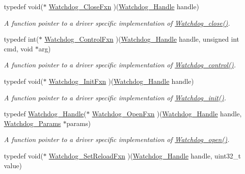 \begin{DoxyCompactItemize}
typedef void($\ast$ \hyperlink{_watchdog_8h_a52c6b4db063cd428c000c7951175f197}{Watchdog\-\_\-\-Close\-Fxn} )(\hyperlink{_watchdog_8h_a00ed22749c947ef200434eeec507f90d}{Watchdog\-\_\-\-Handle} handle)
\begin{DoxyCompactList}\small\item\em A function pointer to a driver specific implementation of \hyperlink{_watchdog_8h_a1c0dfea7011b06f303d01afb631ffbdd}{Watchdog\-\_\-close()}. \end{DoxyCompactList}\item 
typedef int($\ast$ \hyperlink{_watchdog_8h_a36965c48da25f952175822d0f81e1a0a}{Watchdog\-\_\-\-Control\-Fxn} )(\hyperlink{_watchdog_8h_a00ed22749c947ef200434eeec507f90d}{Watchdog\-\_\-\-Handle} handle, unsigned int cmd, void $\ast$arg)
\begin{DoxyCompactList}\small\item\em A function pointer to a driver specific implementation of \hyperlink{_watchdog_8h_aa98a75361edb1e476432669169f2950e}{Watchdog\-\_\-control()}. \end{DoxyCompactList}\item 
typedef void($\ast$ \hyperlink{_watchdog_8h_a21594bd6db5b508572ae7d380b8fae10}{Watchdog\-\_\-\-Init\-Fxn} )(\hyperlink{_watchdog_8h_a00ed22749c947ef200434eeec507f90d}{Watchdog\-\_\-\-Handle} handle)
\begin{DoxyCompactList}\small\item\em A function pointer to a driver specific implementation of \hyperlink{_watchdog_8h_afaadfb59be17661ae95562f2081355e7}{Watchdog\-\_\-init()}. \end{DoxyCompactList}\item 
typedef \hyperlink{_watchdog_8h_a00ed22749c947ef200434eeec507f90d}{Watchdog\-\_\-\-Handle}($\ast$ \hyperlink{_watchdog_8h_a4b02084ebc2b2eccc46861ace7881448}{Watchdog\-\_\-\-Open\-Fxn} )(\hyperlink{_watchdog_8h_a00ed22749c947ef200434eeec507f90d}{Watchdog\-\_\-\-Handle} handle, \hyperlink{struct_watchdog___params}{Watchdog\-\_\-\-Params} $\ast$params)
\begin{DoxyCompactList}\small\item\em A function pointer to a driver specific implementation of \hyperlink{_watchdog_8h_aa5ce656aa6d5199e1efdb4ca2cd9fb7c}{Watchdog\-\_\-open()}. \end{DoxyCompactList}\item 
typedef void($\ast$ \hyperlink{_watchdog_8h_a420d19a34109e5dbb1b5f2953f9a8328}{Watchdog\-\_\-\-Set\-Reload\-Fxn} )(\hyperlink{_watchdog_8h_a00ed22749c947ef200434eeec507f90d}{Watchdog\-\_\-\-Handle} handle, uint32\-\_\-t value)

\end{DoxyCompactItemize}
